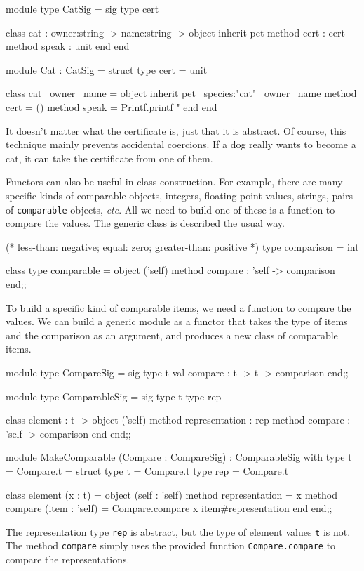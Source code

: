 \begin{ocaml}
module type CatSig =
sig
   type cert

   class cat : owner:string -> name:string ->
   object
      inherit pet
      method cert : cert
      method speak : unit
   end
end

module Cat : CatSig =
struct
   type cert = unit

   class cat ~owner ~name =
   object
       inherit pet ~species:"cat" ~owner ~name
       method cert = ()
       method speak = Printf.printf "%
   end
end
\end{ocaml}
%
It doesn't matter what the certificate is, just that it is abstract.  Of course, this technique
mainly prevents accidental coercions.  If a dog really wants to become a cat, it can take the
certificate from one of them.

Functors can also be useful in class construction.  For example, there are many specific kinds of
comparable objects, integers, floating-point values, strings, pairs of \hbox{\lstinline/comparable/}
objects, \emph{etc}.  All we need to build one of these is a function to compare the values.
The generic class is described the usual way.

\begin{ocaml}
(* less-than: negative; equal: zero; greater-than: positive *)
type comparison = int

class type comparable =
object ('self)
   method compare : 'self -> comparison
end;;
\end{ocaml}
%
To build a specific kind of comparable items, we need a function to compare the values.  We can build
a generic module as a functor that takes the type of items and the comparison as an argument, and produces
a new class of comparable items.

\begin{ocaml}
module type CompareSig =
sig
   type t
   val compare : t -> t -> comparison
end;;

module type ComparableSig =
sig
   type t
   type rep

   class element : t ->
   object ('self)
       method representation : rep
       method compare : 'self -> comparison
   end
end;;

module MakeComparable (Compare : CompareSig)
: ComparableSig with type t = Compare.t =
struct
   type t = Compare.t
   type rep = Compare.t

   class element (x : t) =
   object (self : 'self)
      method representation = x
      method compare (item : 'self) =
         Compare.compare x item#representation
   end
end;;
\end{ocaml}
%
The representation type \hbox{\lstinline/rep/} is abstract, but the type of element values \hbox{\lstinline/t/} is
not.  The method \hbox{\lstinline/compare/} simply uses the provided function \hbox{\lstinline/Compare.compare/}
to compare the representations.


